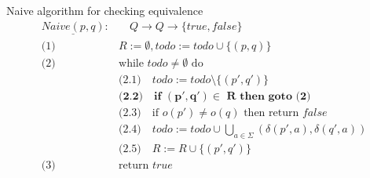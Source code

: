 \begin{frame}{Naive algorithm for checking equivalence}
  \begin{align*}
    \underline{Naive(p, q)}: &\quad Q \to Q \to \{true, false\} \\
    \text{(1) } & R := \emptyset, todo := todo \cup \{(p, q)\} \\
    \text{(2) } & \text{while } todo \neq \emptyset \text{ do}\\
      & \text{(2.1)}\quad todo := todo \setminus \{(p', q')\}\\
      & \textbf{(2.2)}\quad \textbf{if } \mathbf{(p', q') \in} \textbf{ R} \textbf{ then goto (2)}\\
      & \text{(2.3)}\quad \text{if } o(p') \neq o(q) \text{ then return } false\\
      & \text{(2.4)}\quad todo := todo \cup \bigcup_{a \in \Sigma}{(\delta(p', a), \delta(q', a))}\\
      & \text{(2.5)}\quad R := R \cup \{(p', q')\} \\
    \text{(3) } & \text{return } true\\
  \end{align*}
\end{frame}

